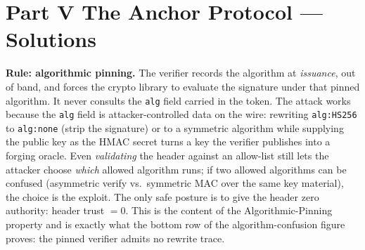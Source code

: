 %

\providecommand{\wbtier}[1]{{\footnotesize\scshape\bfseries\textcolor{hhink}{#1}}}

\providecommand{\wbsol}[2]{%
  \par\medskip\noindent
  \makebox[0pt][r]{\textbf{V.#1}\hspace{1.2em}}%
  \ignorespaces #2\par}

\section*{Part V \quad The Anchor Protocol \quad — Solutions}

\wbsol{1}{%
\textbf{Rule: algorithmic pinning.} The verifier records the algorithm at
\emph{issuance}, out of band, and forces the crypto library to evaluate the
signature under that pinned algorithm. It never consults the \texttt{alg} field
carried in the token. The attack works because the \texttt{alg} field is
attacker-controlled data on the wire: rewriting \texttt{alg:HS256} to
\texttt{alg:none} (strip the signature) or to a symmetric algorithm while
supplying the public key as the HMAC secret turns a key the verifier publishes
into a forging oracle. Even \emph{validating} the header against an allow-list
still lets the attacker choose \emph{which} allowed algorithm runs; if two allowed
algorithms can be confused (asymmetric verify vs.\ symmetric MAC over the same
key material), the choice is the exploit. The only safe posture is to give the
header zero authority: header trust $=0$. This is the content of the
Algorithmic-Pinning property and is exactly what the bottom row of the
algorithm-confusion figure proves: the pinned verifier admits no rewrite trace.}

